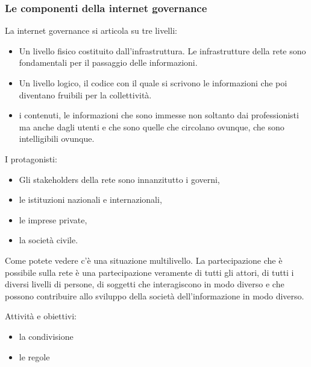  \subsubsection{Le componenti della internet governance}
 La internet governance si articola su tre livelli:
 \begin{itemize}
     \item Un livello fisico costituito dall'infrastruttura. Le infrastrutture della rete sono fondamentali per il passaggio delle informazioni. 
     \item Un livello logico, il codice con il quale si scrivono le informazioni che poi diventano fruibili per la collettività. 
     \item i contenuti, le informazioni che sono immesse non soltanto dai professionisti ma anche dagli utenti e che sono quelle che circolano ovunque, che sono intelligibili ovunque.
 \end{itemize}
 
 I protagonisti:
 
 \begin{itemize}
     \item Gli stakeholders della rete sono innanzitutto i governi, 
     \item le istituzioni nazionali e internazionali, 
     \item le imprese private, 
     \item la società civile.  
 \end{itemize}
 
Come potete vedere c'è una situazione multilivello. La partecipazione che è possibile sulla rete è una partecipazione veramente di tutti gli attori, di tutti i diversi livelli di persone, di soggetti che interagiscono in modo diverso e che possono contribuire allo sviluppo della società dell'informazione in modo diverso. 

Attività e obiettivi:

\begin{itemize}
    \item la condivisione 
    \item le regole
\end{itemize}

